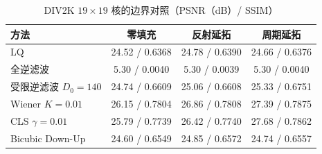 \begin{table}[htbp]
\centering
\caption{DIV2K $ 19\times19$ 核的边界对照（PSNR（dB）/ SSIM）}
\label{tab:div19}
\begin{tabular}{lccc}
\toprule
方法 & 零填充 & 反射延拓 & 周期延拓 \\
\midrule
LQ & 24.52 / 0.6368 & 24.78 / 0.6390 & 24.66 / 0.6376 \\
全逆滤波 & 5.30 / 0.0040 & 5.30 / 0.0039 & 5.30 / 0.0040 \\
受限逆滤波 $D_0=140$ & 24.74 / 0.6609 & 25.06 / 0.6608 & 25.33 / 0.6751 \\
Wiener $K=0.01$ & 26.15 / 0.7804 & 26.86 / 0.7808 & 27.39 / 0.7875 \\
CLS $\gamma=0.01$ & 25.79 / 0.7739 & 26.42 / 0.7740 & 27.68 / 0.7862 \\
Bicubic Down-Up & 24.60 / 0.6549 & 24.85 / 0.6572 & 24.74 / 0.6557 \\
\bottomrule
\end{tabular}
\end{table}
